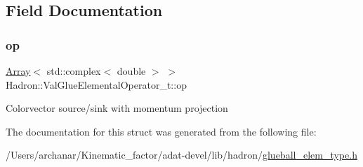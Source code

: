 \subsection{Field Documentation}
\mbox{\label{structHadron_1_1ValGlueElementalOperator__t_ab0bad23294bd9e7f26d0ce2dbdeffef7}} 
\subsubsection{\texorpdfstring{op}{op}}
{\footnotesize\ttfamily \mbox{\hyperlink{classXMLArray_1_1Array}{Array}}$<$ std\+::complex$<$ double $>$ $>$ Hadron\+::\+Val\+Glue\+Elemental\+Operator\+\_\+t\+::op}

Colorvector source/sink with momentum projection 

The documentation for this struct was generated from the following file\+:\begin{DoxyCompactItemize}
\item 
/\+Users/archanar/\+Kinematic\+\_\+factor/adat-\/devel/lib/hadron/\mbox{\hyperlink{adat-devel_2lib_2hadron_2glueball__elem__type_8h}{glueball\+\_\+elem\+\_\+type.\+h}}\end{DoxyCompactItemize}
